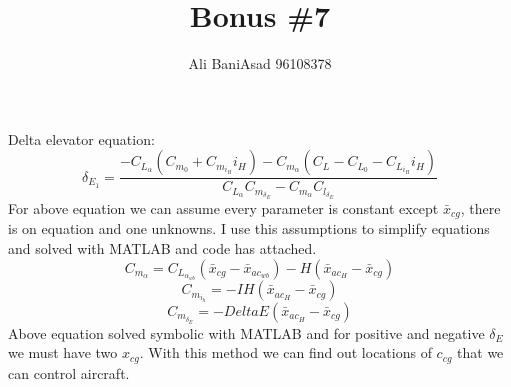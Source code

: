 \documentclass{article}
\title{Bonus \#7}
\author{Ali BaniAsad 96108378}
\begin{document}
\maketitle
Delta elevator equation:
$$\delta_{E_1} = \dfrac{-C_{L_{\alpha}}(C_{m_0} + C_{m_{i_H}} i_H) - C_{m_{\alpha}}(C_L - C_{L_0} -
C_{L_{i_H}}i_H)
 }{C_{L_\alpha} C_{m_{\delta_E}} - C_{m_\alpha}C_{l_{\delta_E}}}
$$
For above equation we can assume every parameter is constant except $\bar x_{cg}$, there is on equation and one unknowns.
I use this assumptions to simplify equations and solved with MATLAB and code has attached.
$$C_{m_\alpha} = C_{L_{\alpha_{wb}}}(\bar x_{cg} - \bar x_{ac_{wb}}) - H( \bar x_{ac_{H}}-\bar x_{cg} )  $$
$$C_{m_{i_h}} = -IH( \bar x_{ac_{H}}-\bar x_{cg} )  $$
$$C_{m_{\delta_E}} = -DeltaE( \bar x_{ac_{H}}-\bar x_{cg} )  $$
Above equation solved symbolic with MATLAB and for positive and negative $\delta_E$ we must have two $x_{cg}$.
With this method we can find out  locations of $c_{cg}$ that we can control aircraft.
\end{document}
